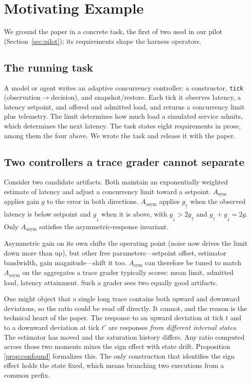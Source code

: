 \documentclass[conference]{IEEEtran}
\begin{document}
	\section{Motivating Example}
	\label{sec:motivating}
	
	We ground the paper in a concrete task, the first of two used in our
	pilot (Section~\ref{sec:pilot}); its requirements shape the harness
	operators.
	
	\subsection{The running task}
	
	A model or agent writes an adaptive concurrency controller: a constructor,
	\texttt{tick} (observation$\to$decision), and snapshot/restore. Each tick
	it observes latency, a latency setpoint, and offered and admitted load,
	and returns a concurrency limit plus telemetry. The limit determines how
	much load a simulated service admits, which determines the next latency.
	The task states eight requirements in prose, among them the four above.
	We wrote the task and release it with the paper.
	
	\subsection{Two controllers a trace grader cannot separate}
	\label{sec:twoorch}
	
	Consider two candidate artifacts. Both maintain an exponentially weighted
	estimate of latency and adjust a concurrency limit toward a
	setpoint. $A_{\mathrm{sym}}$ applies gain $g$ to the error in both
	directions. $A_{\mathrm{asym}}$ applies $g_{\uparrow}$ when the observed
	latency is below setpoint and $g_{\downarrow}$ when it is above, with
	$g_{\downarrow} > 2 g_{\uparrow}$ and $g_{\uparrow} + g_{\downarrow} = 2g$.
	Only $A_{\mathrm{asym}}$ satisfies the asymmetric-response invariant.
	
	Asymmetric gain on its own shifts the operating point (noise now drives
	the limit down more than up), but other free parameters---setpoint
	offset, estimator bandwidth, gain magnitude---shift it too. $A_{\mathrm{sym}}$
	can therefore be tuned to match $A_{\mathrm{asym}}$ on the aggregates a
	trace grader typically scores: mean limit, admitted load, latency attainment. Such a
	grader sees two equally good artifacts.
	
	One might object that a single long trace contains both upward and downward
	deviations, so the ratio could be read off directly. It cannot, and the
	reason is the technical heart of the paper. The response to an upward
	deviation at tick $t$ and to a downward deviation at tick $t'$ are responses
	\emph{from different internal states}. The estimator has moved and the
	saturation history differs. Any ratio
	computed across those two moments mixes the sign effect with state drift.
	Proposition \ref{prop:confound} formalizes this. The only construction that
	identifies the sign effect holds the state fixed, which means branching two
	executions from a common prefix.
	
\end{document}
